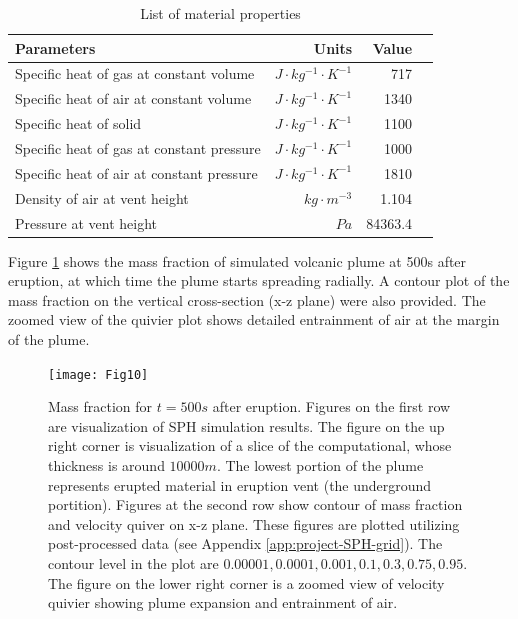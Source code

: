 \documentclass[gmd, manuscript]{copernicus}
\begin{document}
\begin{table}[htp]
	\begin{centering}
      \caption{List of material properties}		
	  \begin{tabular}{lrrr}
	    \hline
	    Parameters & Units  & Value \\
	    \hline
	    	Specific heat of gas at constant volume     & $J \cdot kg^{-1}\cdot K^{-1}$& 717     \\
	    Specific heat of air at constant volume     & $J \cdot kg^{-1}\cdot K^{-1}$& 1340    \\
	    	Specific heat of solid                      & $J \cdot kg^{-1}\cdot K^{-1}$& 1100    \\
	    	Specific heat of gas at constant pressure   & $J \cdot kg^{-1}\cdot K^{-1}$& 1000    \\
	    	Specific heat of air at constant pressure   & $J \cdot kg^{-1}\cdot K^{-1}$& 1810    \\
	    	Density of air at vent height               & $kg \cdot m^{-3}$       & 1.104   \\
	    Pressure at vent height                        & $Pa$              & 84363.4 \\
	    \hline
	  \end{tabular}
	  \label{tab:material_properties}
	\end{centering}
\end{table}

Figure \ref{fig:pinatubo-simulation-results-vis} shows the mass fraction of simulated volcanic plume at 500s after eruption, at which time the plume starts spreading radially. A contour plot of the mass fraction on the vertical cross-section (x-z plane) were also provided. The zoomed view of the quivier plot shows detailed entrainment of air at the margin of the plume.

\begin{figure}[!htb]
    \centering
	  \texttt{[image: Fig10]}
    \caption{Mass fraction for $t=500s$ after eruption. Figures on the first row are visualization of SPH simulation results. The figure on the up right corner is visualization of a slice of the computational, whose thickness is around $10000m$. The lowest portion of the plume represents erupted material in eruption vent (the underground portition). Figures at the second row show contour of mass fraction and velocity quiver on x-z plane. These figures are plotted utilizing post-processed data (see Appendix \ref{app:project-SPH-grid}). The contour level in the plot are $0.00001, 0.0001, 0.001, 0.1, 0.3, 0.75, 0.95$. The figure on the lower right corner is a zoomed view of velocity quivier showing plume expansion and entrainment of air.}
    \label{fig:pinatubo-simulation-results-vis}
\end{figure}
\end{document}
